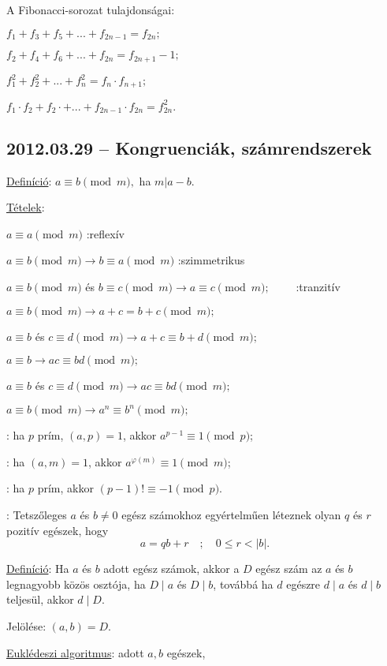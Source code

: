 A Fibonacci-sorozat tulajdonságai:

$f_1+f_3+f_5+...+f_{2n-1}=f_{2n};$

$f_2+f_4+f_6+...+f_{2n}=f_{2n+1}-1;$

$f_1^2+f_2^2+...+f_n^2=f_n\cdot f_{n+1};$

$f_1\cdot f_2+f_2\cdot +...+f_{2n-1}\cdot f_{2n}=f_{2n}^2.$

\subsection*{2012.03.29 -- Kongruenciák, számrendszerek}
\underline{Definíció}: $a\equiv b \pmod{m},$ ha $m|a-b$.

\noindent\underline{Tételek}:

$a\equiv a\pmod{m}$ :reflexív

$a\equiv b\pmod{m} \longrightarrow b\equiv a\pmod{m}$ :szimmetrikus

$a\equiv b\pmod{m}$ és $b\equiv c\pmod{m}\longrightarrow a\equiv c\pmod{m};\qquad$ :tranzitív

$a\equiv b\pmod{m}\longrightarrow a+c=b+c\pmod{m};$

$a\equiv b$ és $c\equiv d\pmod{m} \longrightarrow a+c\equiv b+d\pmod{m};$

$a\equiv b\longrightarrow ac\equiv bd\pmod{m};$

$a\equiv b$ és $c\equiv d\pmod{m}\longrightarrow ac\equiv bd\pmod{m};$

$a\equiv b\pmod{m}\longrightarrow a^n\equiv b^n\pmod{m};$

: ha $p$ prím, $(a,p)=1$, akkor 
$a^{p-1}\equiv 1\pmod{p}$;

: ha $(a,m)=1$, akkor 
$a^{\varphi(m)}\equiv 1\pmod{m}$;

: ha $p$ prím, akkor 
$(p-1)!\equiv -1\pmod{p}$.

: Tetszőleges $a$ és $b\not=0$ egész számokhoz egyértelműen léteznek olyan $q$ és $r$ pozitív egészek, hogy
$$a=qb+r\quad ;\quad 0\leq r<|b|.$$

\noindent\underline{Definíció}: Ha $a$ és $b$ adott egész számok, akkor a  $D$ egész szám az $a$ és $b$ legnagyobb közös osztója, ha $D\mid a$ és $D\mid b$, továbbá ha $d$ egészre $d\mid a$ és $d\mid b$ teljesül, akkor $d\mid D$.

Jelölése: $(a,b)=D$.

\noindent\underline{Euklédeszi algoritmus}: adott  $a,b$ egészek,

